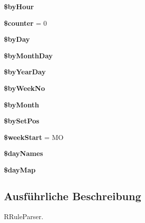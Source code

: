 \begin{DoxyCompactItemize}
{\bfseries \$by\+Hour}
\item 
\mbox{\label{class_sabre_1_1_v_object_1_1_recur_1_1_r_rule_iterator_a195444401830b6fda217b2055eba35bb}} 
{\bfseries \$counter} = 0
\item 
\mbox{\label{class_sabre_1_1_v_object_1_1_recur_1_1_r_rule_iterator_a4cd39dfe41d33d0136508e0c32ce334b}} 
{\bfseries \$by\+Day}
\item 
\mbox{\label{class_sabre_1_1_v_object_1_1_recur_1_1_r_rule_iterator_a83f39e6bcd00351226407e8162fd968d}} 
{\bfseries \$by\+Month\+Day}
\item 
\mbox{\label{class_sabre_1_1_v_object_1_1_recur_1_1_r_rule_iterator_a4cd12ab80b9544731ae76c40605baf40}} 
{\bfseries \$by\+Year\+Day}
\item 
\mbox{\label{class_sabre_1_1_v_object_1_1_recur_1_1_r_rule_iterator_a62b6da5596372281fa546a48761e4422}} 
{\bfseries \$by\+Week\+No}
\item 
\mbox{\label{class_sabre_1_1_v_object_1_1_recur_1_1_r_rule_iterator_a292c0291da1c580bbc300c6991679e16}} 
{\bfseries \$by\+Month}
\item 
\mbox{\label{class_sabre_1_1_v_object_1_1_recur_1_1_r_rule_iterator_afbfb584fddd673005cfa9f292fae8a13}} 
{\bfseries \$by\+Set\+Pos}
\item 
\mbox{\label{class_sabre_1_1_v_object_1_1_recur_1_1_r_rule_iterator_ab0349e132823953789a144dc8ba1dd83}} 
{\bfseries \$week\+Start} = \textquotesingle{}MO\textquotesingle{}
\item 
{\bfseries \$day\+Names}
\item 
{\bfseries \$day\+Map}
\end{DoxyCompactItemize}


\subsection{Ausführliche Beschreibung}
R\+Rule\+Parser.

